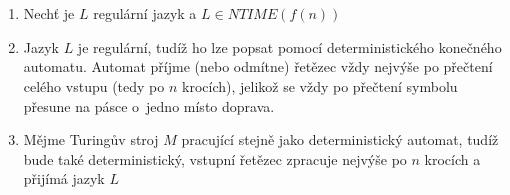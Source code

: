 \documentclass[a4paper]{article}
\begin{document}
\section*{}
\begin{enumerate}
    \item Nechť je $L$ regulární jazyk a $L \in NTIME(f(n))$
    \item Jazyk $L$ je regulární, tudíž ho lze popsat pomocí deterministického konečného automatu.%
    Automat příjme (nebo odmítne) řetězec vždy nejvýše po přečtení celého vstupu (tedy po $n$ krocích),
    jelikož se vždy po přečtení symbolu přesune na pásce o~jedno místo doprava.
    \item Mějme Turingův stroj $M$ pracující stejně jako deterministický automat, tudíž bude také deterministický, vstupní řetězec zpracuje
    nejvýše po $n$ krocích a přijímá jazyk $L$
    \begin{comment}
    \item Tento automat pak lze simulovat pomocí deterministického Turingova stroje $M=(Q, \Sigma, \Gamma, \delta, q_0, q_f)$, kde:
    \begin{itemize}
        \item $Q=Q_{KA}\cup \{q_f\}$
        \item $\Gamma = \Sigma \cup \{\Delta\}$
        \item $\delta$ je zkonstruovaná následovně:
        \begin{itemize}
            \item $\forall q \in Q\, \forall a \in \Sigma: (q,R) = \delta(p,a) \Leftrightarrow q=\delta_{KA}(p,a)$
            \item $\forall q \in F_{KA}: (q_f,\Delta) = \delta(q,\Delta)$
        \end{itemize}
        \item $q_0 = q_{0_{KA}}$
        \item $q_f \in Q \wedge q_f \notin Q_{KA}$
    \end{itemize}
    \item Počáteční konfigurace $M$ je $(q_0,\underline{a_1} a_2 a_3\ldots a_n\Delta^{\omega})$, kde $a_1a_2a_3\ldots a_n \in \Sigma^*$
    \item Časová složitost stroje $M$ je funkce $T_M(n)=n+1$, a tedy stroj libovolný vstup zpracuje nanejvýš po $n+1$ krocích.
    Z~jeho definice je zřejmé, že musí projít přes první symbol řetězce $w$ až po jeho poslední symbol a poté teprve
    přejde do koncového stavu.
    V~každém kroku, kdy má pod hlavou symbol z~$\Sigma$ udělá pohyb hlavou doprava nebo se zasekne a tím řetězec odmítne.
    Takovýchto kroků udělá nanejvýše $n$, kde $|\omega| = n$.
    Pokud je pod hlavou symbol $\Delta$ může buď přejít do koncového stavu nebo se zaseknout, a tak řetězec odmítnout.
    Tento krok může být učiněn maximálně jeden.
    Dohromady tedy může provést nejvýše $n+1$ kroků.
    \end{comment}


\end{enumerate}
\end{document}
